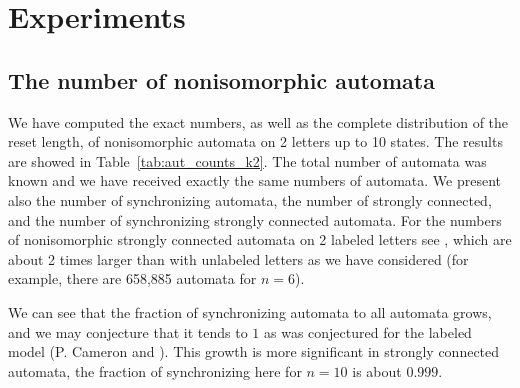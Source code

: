 \documentclass[runningheads,a4paper]{llncs}
\newcommand{\<}{\langle}
\renewcommand{\>}{\rangle}
\begin{document}
\section{Experiments}\label{sec:exp}

\subsection{The number of nonisomorphic automata}
We have computed the exact numbers, as well as the complete distribution of the reset length, of nonisomorphic automata on 2 letters up to 10 states. The results are showed in Table~\ref{tab:aut_counts_k2}. The total number of automata was known \cite{Ha1965} and we have received exactly the same numbers of automata. We present also the number of synchronizing automata, the number of strongly connected, and the number of synchronizing strongly connected automata. For the numbers of nonisomorphic strongly connected automata on 2 labeled letters see \cite{Li1971}, which are about 2 times larger than with unlabeled letters as we have considered (for example, there are 658,885 automata for $n=6$).

We can see that the fraction of synchronizing automata to all automata grows, and we may conjecture that it tends to $1$ as was conjectured for the labeled model (P. Cameron and \cite{ST2011}). This growth is more significant in strongly connected automata, the fraction of synchronizing here for $n=10$ is about $0.999$.
\end{document}
